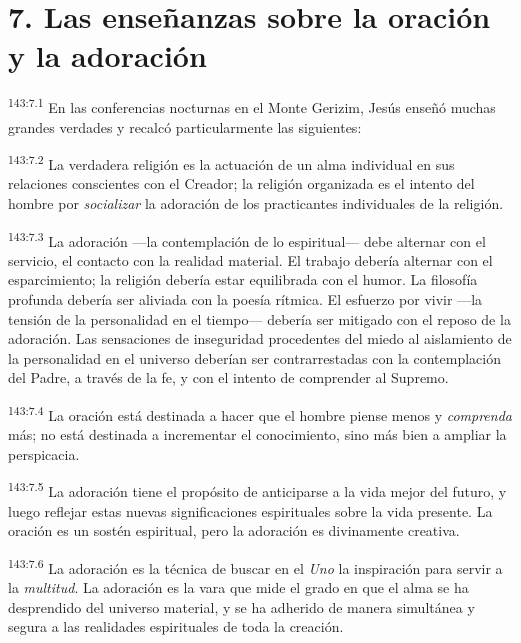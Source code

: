 \section*{7. Las enseñanzas sobre la oración y la adoración}
\par 
\textsuperscript{143:7.1} En las conferencias nocturnas en el Monte Gerizim, Jesús enseñó muchas grandes verdades y recalcó particularmente las siguientes:

\par 
\textsuperscript{143:7.2} La verdadera religión es la actuación de un alma individual en sus relaciones conscientes con el Creador; la religión organizada es el intento del hombre por \textit{socializar} la adoración de los practicantes individuales de la religión.

\par 
\textsuperscript{143:7.3} La adoración ---la contemplación de lo espiritual--- debe alternar con el servicio, el contacto con la realidad material. El trabajo debería alternar con el esparcimiento; la religión debería estar equilibrada con el humor. La filosofía profunda debería ser aliviada con la poesía rítmica. El esfuerzo por vivir ---la tensión de la personalidad en el tiempo--- debería ser mitigado con el reposo de la adoración. Las sensaciones de inseguridad procedentes del miedo al aislamiento de la personalidad en el universo deberían ser contrarrestadas con la contemplación del Padre, a través de la fe, y con el intento de comprender al Supremo.

\par 
\textsuperscript{143:7.4} La oración está destinada a hacer que el hombre piense menos y \textit{comprenda} más; no está destinada a incrementar el conocimiento, sino más bien a ampliar la perspicacia.

\par 
\textsuperscript{143:7.5} La adoración tiene el propósito de anticiparse a la vida mejor del futuro, y luego reflejar estas nuevas significaciones espirituales sobre la vida presente. La oración es un sostén espiritual, pero la adoración es divinamente creativa.

\par 
\textsuperscript{143:7.6} La adoración es la técnica de buscar en el \textit{Uno} la inspiración para servir a la \textit{multitud}. La adoración es la vara que mide el grado en que el alma se ha desprendido del universo material, y se ha adherido de manera simultánea y segura a las realidades espirituales de toda la creación.

